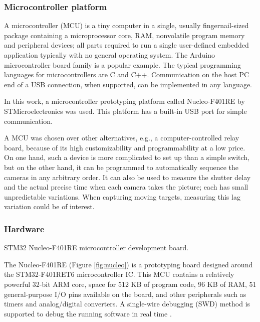 \subsubsection{Microcontroller platform}

A microcontroller (MCU) is a tiny computer in a single, usually fingernail-sized package containing a microprocessor core, RAM, nonvolatile program memory and peripheral devices; all parts required to run a single user-defined embedded application typically with no general operating system.
The Arduino microcontroller board family \cite{arduino} is a popular example.
The typical programming languages for microcontrollers are C and C++.
Communication on the host PC end of a USB connection, when supported, can be implemented in any language.

In this work, a microcontroller prototyping platform called Nucleo-F401RE by STMicroelectronics \cite{stnucleo} was used.
This platform has a built-in USB port for simple communication.

A MCU was chosen over other alternatives, e.g., a computer-controlled relay board, because of its high customizability and programmability at a low price.
On one hand, such a device is more complicated to set up than a simple switch, but on the other hand, it can be programmed to automatically sequence the cameras in any arbitrary order.
It can also be used to measure the shutter delay and the actual precise time when each camera takes the picture; each has small unpredictable variations.
When capturing moving targets, measuring this lag variation could be of interest.

\subsubsection{Hardware}

{STM32 Nucleo-F401RE microcontroller development board.}

The Nucleo-F401RE (Figure \ref{fig:nucleo}) is a prototyping board designed around the STM32-F401RET6 microcontroller IC.
This MCU contains a relatively powerful 32-bit ARM core, space for 512 KB of program code, 96 KB of RAM, 51 general-purpose I/O pins available on the board, and other peripherals such as timers and analog/digital converters.
A single-wire debugging (SWD) method is supported to debug the running software in real time \cite{stnucleo}.

